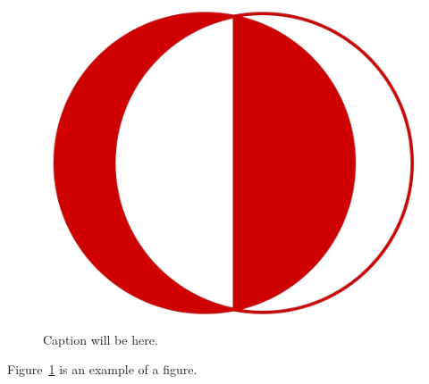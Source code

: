 \begin{figure}[tb]
\centering
\includegraphics[width = 0.4\hsize]{./figures/odtu_logo}
\caption{Caption will be here.}
\label{fig:logo}
\end{figure}

Figure~\ref{fig:logo} is an example of a figure. 
